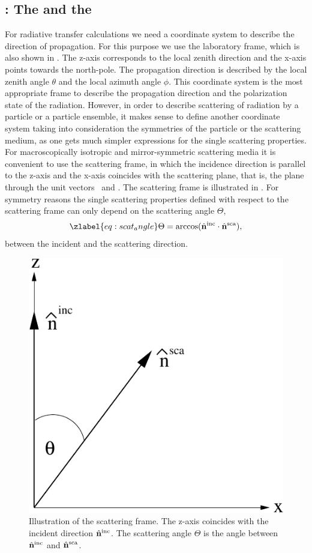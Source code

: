 \subsection[Coordinate systems]{: The
   and the  }

For radiative transfer calculations we need a coordinate system to
describe the direction of propagation. For this purpose we use the
laboratory frame, which is also shown in
.  The z-axis corresponds to the
local zenith direction and the x-axis points towards the
north-pole. The propagation direction is described by the local zenith
angle $\theta$ and the local azimuth angle $\phi$.  This coordinate
system is the most appropriate frame to describe the propagation
direction and the polarization state of the radiation.  However, in
order to describe scattering of radiation by a particle or a particle
ensemble, it makes sense to define another coordinate system taking
into consideration the symmetries of the particle or the scattering
medium, as one gets much simpler expressions for the single scattering
properties.  For macroscopically isotropic and mirror-symmetric
scattering media it is convenient to use the scattering frame, in
which the incidence direction is parallel to the z-axis and the x-axis
coincides with the scattering plane, that is, the plane through the
unit vectors \ and . The
scattering frame is illustrated in
. For symmetry reasons the single
scattering properties defined with respect to the scattering frame can
only depend on the scattering angle $\Theta$,
\begin{equation}
  \zlabel{eq:scat_angle}
  \Theta=\arccos(\hat{\PDir}^{\inc} \cdot {\hat{\PDir}^{\sca}}),
\end{equation}
between the incident and the scattering direction.

\begin{figure}[htbp]
 \begin{center}
   \includegraphics*[width=0.4\hsize]{part_frame}
   \caption{Illustration of the scattering frame. The z-axis coincides with the incident direction $\hat{{\bf n}}^{\mathrm{inc}}$. The scattering angle $\Theta$ is the angle between  $\hat{{\bf n}}^{\mathrm{inc}}$ and $\hat{{\bf n}}^{\mathrm{sca}}$.}
 \end{center}
\end{figure}

